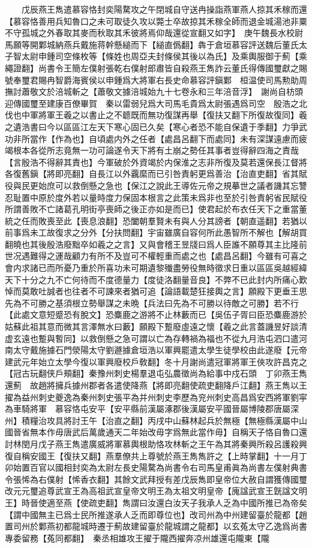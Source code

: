 　　戊辰燕王雋遣慕容恪封奕陽騖攻之午閉城自守送冉操詣燕軍燕人掠其禾稼而還【慕容恪善用兵知魯口之未可取徒久攻以斃士卒故掠其禾稼全師而退金城湯池非粟不守孤城之外春取其麥而秋取其禾彼將焉仰哉還從宣翻又如字】　庚午魏長水校尉馬願等開鄴城納燕兵戴施蒋幹懸縋而下【縋直僞翻】犇于倉垣慕容評送魏后董氏太子智太尉申鍾司空條枚等【條姓也周亞夫封條侯其後以為氏】及乘輿服御于薊【乘繩證翻】尚書令王簡左僕射張乾右僕射郎肅皆自殺燕王雋詐云董氏得傳國璽獻之賜號奉璽君賜冉智爵海賓侯以申鍾爲大將軍右長史命慕容評鎭鄴　桓温使司馬勲助周撫討蕭敬文於涪城斬之【蕭敬文據涪城始九十七卷永和三年涪音浮】　謝尚自枋頭迎傳國璽至建康百僚畢賀　秦以雷弱兒爲大司馬毛貴爲太尉張遇爲司空　殷浩之北伐也中軍將軍王羲之以書止之不聼既而無功復謀再舉【復扶又翻下所復故復同】羲之遺浩書曰今以區區江左天下寒心固已久矣【寒心者恐不能自保遺于季翻】力爭武功非所當作【作為也】自頃處内外之任者【處昌呂翻下而處同】未有深謀遠慮而疲竭根本各從所志竟無一功可論遂令天下將有土崩之勢任其事者豈得辭四海之責哉【言殷浩不得辭其責也】今軍破於外資竭於内保淮之志非所復及莫若還保長江督將各復舊鎭【將即亮翻】自長江以外覊縻而已引咎責躬更爲善治【治直吏翻】省其賦役與民更始庶可以救倒懸之急也【保江之說此王導佐元帝之規摹世之議者譏其忘讐忍耻置中原於度外若以量時度力保固本根言之此策未爲非也至於引咎責躬省民賦役所謂善敗不亡諸葛孔明街亭喪師之後正亦如是而已】使君起於布衣任天下之重當董統之任而敗喪至此【喪息浪翻】恐闔朝羣賢未有與人分其謗者【朝直遥翻】若猶以前事爲未工故復求之分外【分扶問翻】宇宙雖廣自容何所此愚智所不解也【解胡買翻曉也其後殷浩廢黜卒如羲之之言】又與會稽王昱牋曰爲人臣誰不願尊其主比隆前世况遇難得之運哉顧力有所不及豈可不權輕重而處之也【處昌呂翻】今雖有可喜之會内求諸已而所憂乃重於所喜功未可期遺黎殱盡勞役無時徵求日重以區區吳越經緯天下十分之九不亡何待而不度德量力【度徒洛翻量音良】不弊不已此封内所痛心歎悼而莫敢吐誠者也往者不可諫來者猶可追【論語載楚狂接輿之言】願殿下更垂王思先為不可勝之基須根立勢舉謀之未晩【兵法曰先為不可勝以待敵之可勝】若不行【此處文意短蹙恐有脫文】恐麋鹿之游將不止林藪而已【吳伍子胥曰臣恐麋鹿游於姑蘇此祖其意而微其言澤無水曰藪】願殿下蹔廢虛遠之懷【羲之此言蓋譏昱好談清虚玄遠也蹔與暫同】以救倒懸之急可謂以亡為存轉禍為福也不從九月浩屯泗口遣河南太守戴施據石門滎陽太守劉遯據倉垣浩以軍興罷遣太學生徒學校由此遂廢【元帝建武元年始立太學今復以軍興廢校戶敎翻】冬十月謝尚遣冠軍將軍王俠攻許昌克之【冠古玩翻侠戶頰翻】秦豫州刺史楊羣退屯弘農徵尚為給事中戍石頭　丁卯燕王雋還薊　故趙將擁兵據州郡者各遣使降燕【將即亮翻使疏吏翻降戶江翻】燕王雋以王擢為益州刺史夔逸為秦州刺史張平為并州刺史李歷為兖州刺史高昌爲安西將軍劉寜為車騎將軍　慕容恪屯安平【安平縣前漢屬涿郡後漢屬安平國晉屬博陵郡唐屬深州】積糧治攻具將討王午【治直之翻】丙戌中山蘇林起兵於無極【無極縣漢屬中山國晉省無本作毋唐武后萬歲通天二年始改毋字爲無此當作毋】自稱天子恪自魯口還討林閏月戊子燕王雋遣廣威將軍慕輿根助恪攻林斬之王午為其將秦興所殺呂護殺興復自稱安國王【復扶又翻】燕羣僚共上尊號於燕王雋雋許之【上時掌翻】十一月丁卯始置百官以國相封奕為太尉左長史陽騖為尚書令右司馬皇甫眞為尚書左僕射典書令張悕為右僕射【悕香衣翻】其餘文武拜授有差戊辰雋即皇帝位大赦自謂獲傳國璽改元元璽追尊武宣王為高祖武宣皇帝文明王為太祖文明皇帝【廆諡武宣王皝諡文明王】時晉使適至燕【使疏吏翻】雋謂曰汝還白汝天子我承人乏為中國所推已為帝矣【謂中國無主已爲士民所推遂承人乏而即尊位也】改司州為中州建留臺於龍都【趙置司州於鄴燕初都龍城時遷于薊故建留臺於龍城謂之龍都】以玄菟太守乙逸爲尚書專委留務【菟同都翻】　秦丞相雄攻王擢于隴西擢奔凉州雄還屯隴東【隴
